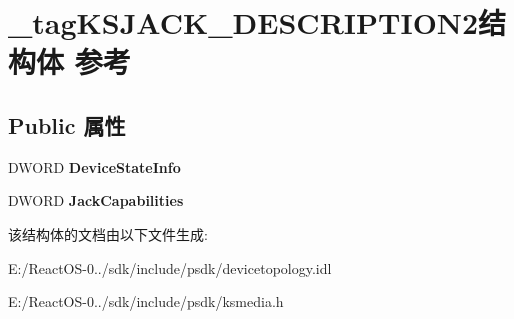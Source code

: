\hypertarget{struct__tag_k_s_j_a_c_k___d_e_s_c_r_i_p_t_i_o_n2}{}\section{\+\_\+tag\+K\+S\+J\+A\+C\+K\+\_\+\+D\+E\+S\+C\+R\+I\+P\+T\+I\+O\+N2结构体 参考}
\label{struct__tag_k_s_j_a_c_k___d_e_s_c_r_i_p_t_i_o_n2}
\subsection*{Public 属性}
\begin{DoxyCompactItemize}
\item 
\mbox{\label{struct__tag_k_s_j_a_c_k___d_e_s_c_r_i_p_t_i_o_n2_af293d7d7d28d181802ce92fef9ffdd45}} 
D\+W\+O\+RD {\bfseries Device\+State\+Info}
\item 
\mbox{\label{struct__tag_k_s_j_a_c_k___d_e_s_c_r_i_p_t_i_o_n2_a43c3043182b781835617f8bf666e7250}} 
D\+W\+O\+RD {\bfseries Jack\+Capabilities}
\end{DoxyCompactItemize}


该结构体的文档由以下文件生成\+:\begin{DoxyCompactItemize}
\item 
E\+:/\+React\+O\+S-\/0../sdk/include/psdk/devicetopology.\+idl\item 
E\+:/\+React\+O\+S-\/0../sdk/include/psdk/ksmedia.\+h\end{DoxyCompactItemize}
